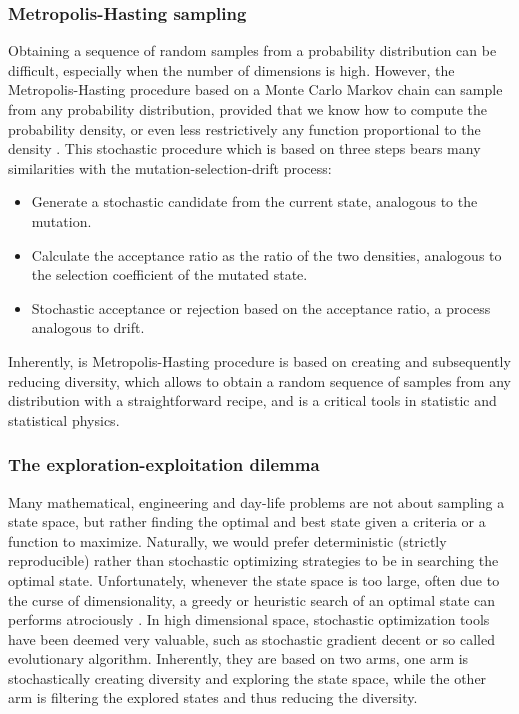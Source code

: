 \subsubsection{Metropolis-Hasting sampling}
Obtaining a sequence of random samples from a probability distribution can be difficult, especially when the number of dimensions is high.
However, the Metropolis-Hasting procedure based on a Monte Carlo Markov chain can sample from any probability distribution, provided that we know how to compute the probability density, or even less restrictively any function proportional to the density \cite{Hastings1970}.
This stochastic procedure which is based on three steps bears many similarities with the mutation-selection-drift process:
\begin{itemize}
	\item Generate a stochastic candidate from the current state, analogous to the mutation.
	\item Calculate the acceptance ratio as the ratio of the two densities, analogous to the selection coefficient of the mutated state.
	\item Stochastic acceptance or rejection based on the acceptance ratio, a process analogous to drift. 
\end{itemize}
Inherently, is Metropolis-Hasting procedure is based on creating and subsequently reducing diversity, which allows to obtain a random sequence of samples from any distribution with a straightforward recipe, and is a critical tools in statistic and statistical physics.

\subsubsection{The exploration-exploitation dilemma}
Many mathematical, engineering and day-life problems are not about sampling a state space, but rather finding the optimal and best state given a criteria or a function to maximize.
Naturally, we would prefer deterministic (strictly reproducible) rather than stochastic optimizing strategies to be in searching the optimal state.
Unfortunately, whenever the state space is too large, often due to the curse of dimensionality, a greedy or heuristic search of an optimal state can performs atrociously \cite{Bellman1966}.
In high dimensional space, stochastic optimization tools have been deemed very valuable, such as stochastic gradient decent or so called evolutionary algorithm.
Inherently, they are based on two arms, one arm is stochastically creating diversity and exploring the state space, while the other arm is filtering the explored states and thus reducing the diversity.

